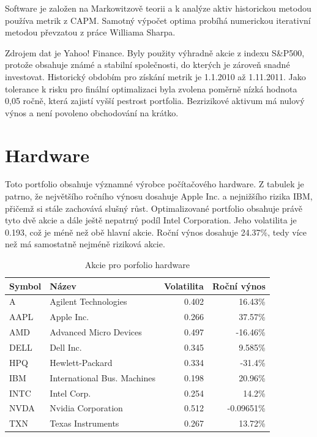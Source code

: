 \documentclass[12pt,a4paper]{report}
\begin{document}
  Software je založen na Markowitzově teorii a k analýze aktiv historickou metodou používa metrik z CAPM. Samotný výpočet optima probíhá numerickou iterativní metodou převzatou z práce Williama Sharpa\cite{sharpe}.
  
  Zdrojem dat je Yahoo! Finance\cite{yahoo}. Byly použity výhradně akcie z indexu S\&P500, protože obsahuje známé a stabilní společnosti, do kterých je zároveň snadné investovat. Historický obdobím pro získání metrik je 1.1.2010 až 1.11.2011. Jako tolerance k risku pro finální optimalizaci byla zvolena poměrně nízká hodnota 0,05 ročně, která zajistí vyšší pestrost portfolia. Bezrizikové aktivum má nulový výnos a není povoleno obchodování na krátko.
  \section{Hardware}
    Toto portfolio obsahuje významné výrobce počítačového hardware. Z tabulek je patrno, že největšího ročního výnosu dosahuje Apple Inc. a nejnižšího rizika IBM, přičemž si stále zachovává slušný růst. Optimalizované portfolio obsahuje právě tyto dvě akcie a dále ještě nepatrný podíl Intel Corporation. Jeho volatilita je 0.193, což je méně než obě hlavní akcie. Roční výnos dosahuje 24.37\%, tedy více než má samostatně nejméně riziková akcie.
    \begin{table}[htb]
      \centering
      \begin{tabular}{|l|l|r|r|}
        \hline
        Symbol&Název&Volatilita&Roční výnos\\\hline\hline
        A&Agilent Technologies &0.402&16.43\%\\\hline
        AAPL&Apple Inc. &0.266&37.57\%\\\hline
        AMD&Advanced Micro Devices &0.497&-16.46\%\\\hline
        DELL&Dell Inc. &0.345&9.585\%\\\hline
        HPQ&Hewlett-Packard &0.334&-31.4\%\\\hline
        IBM&International Bus. Machines &0.198&20.96\%\\\hline
        INTC&Intel Corp. &0.254&14.2\%\\\hline
        NVDA&Nvidia Corporation &0.512&-0.09651\%\\\hline
        TXN&Texas Instruments &0.267&13.72\%\\\hline
      \end{tabular}
      \caption{Akcie pro porfolio hardware}
    \end{table}
\end{document}
